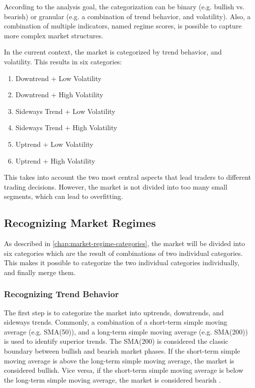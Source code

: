 \noindent
According to the analysis goal, the categorization can be binary (e.g. bullish vs. bearish) or granular (e.g. a combination of trend behavior, and volatility).
Also, a combination of multiple indicators, named regime scores, is possible to capture more complex market structures.

In the current context, the market is categorized by trend behavior, and volatility.
This results in six categories:

\begin{enumerate}
    \item Downtrend + Low Volatility
    \item Downtrend + High Volatility
    \item Sideways Trend + Low Volatility
    \item Sideways Trend + High Volatility
    \item Uptrend + Low Volatility
    \item Uptrend + High Volatility
\end{enumerate}

\noindent
This takes into account the two most central aspects that lead traders to different trading decisions.
However, the market is not divided into too many small segments, which can lead to overfitting.

\subsection{Recognizing Market Regimes}

As described in \autoref{chap:market-regime-categories}, the market will be divided into six categories which are the result of combinations of two individual categories.
This makes it possible to categorize the two individual categories individually, and finally merge them.

\subsubsection{Recognizing Trend Behavior}
\label{chap:recognizing-trend}

The first step is to categorize the market into uptrends, downtrends, and sideways trends.
Commonly, a combination of a short-term simple moving average (e.g. SMA(50)), and a long-term simple moving average (e.g. SMA(200)) is used to identify superior trends.
The SMA(200) is considered the classic boundary between bullish and bearish market phases.
If the short-term simple moving average is above the long-term simple moving average, the market is considered bullish.
Vice versa, if the short-term simple moving average is below the long-term simple moving average, the market is considered bearish \cite{ig-regimes-mas}.

